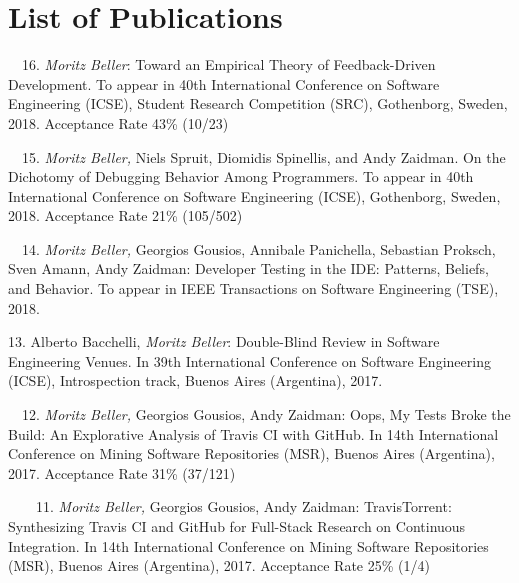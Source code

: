 \chapter*{List of Publications}
\label{publications}

\begin{etaremune}{\small
\item[\faFileTextO~~16.] \emph{Moritz Beller}: Toward an Empirical Theory of
  Feedback-Driven Development. To appear in 40th International Conference on
  Software Engineering (ICSE), Student Research Competition (SRC),
  Gothenborg, Sweden, 2018. Acceptance Rate 43\% (10/23)

\item[\faFileTextO~~15.] \emph{Moritz Beller,} Niels Spruit, Diomidis Spinellis, and Andy
  Zaidman. On the Dichotomy of Debugging Behavior Among Programmers. To appear in 40th
  International Conference on Software Engineering (ICSE), Gothenborg, Sweden, 2018. Acceptance
  Rate 21\% (105/502)

\item[\faFileTextO~~14.] \emph{Moritz Beller,} Georgios Gousios, Annibale Panichella, Sebastian
  Proksch, Sven Amann, Andy Zaidman: Developer Testing in the IDE: Patterns, Beliefs, and
  Behavior. To appear in IEEE Transactions on Software Engineering (TSE), 2018.

\item[13.] Alberto Bacchelli, \emph{Moritz Beller}: Double-Blind Review in Software Engineering
  Venues. In 39th International Conference on Software Engineering (ICSE),
  Introspection track, Buenos Aires
  (Argentina), 2017.

\item[\faFileTextO~~12.] \emph{Moritz Beller,} Georgios Gousios, Andy Zaidman: Oops, My Tests
  Broke the Build: An Explorative Analysis of Travis CI with GitHub. In 14th International
  Conference on Mining Software Repositories (MSR), Buenos Aires (Argentina), 2017.  Acceptance
  Rate 31\% (37/121)

\item[\faTrophy~~\faFileTextO~~11.] \emph{Moritz Beller,} Georgios Gousios, Andy Zaidman:
  TravisTorrent: Synthesizing Travis CI and GitHub for Full-Stack Research on Continuous
  Integration. In 14th International Conference on Mining Software Repositories (MSR), Buenos Aires
  (Argentina), 2017.  Acceptance Rate 25\% (1/4)

}
\end{etaremune}
